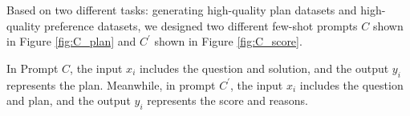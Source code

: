 \documentclass[11pt]{article}
\begin{document}

Based on two different tasks: generating high-quality plan datasets and high-quality preference datasets, we designed two different few-shot prompts $C$ shown in Figure \ref{fig:C_plan} and $C^{'}$ shown in Figure \ref{fig:C_score}. 


In Prompt $C$, the input $x_i$ includes the question and solution, and the output $y_i$ represents the plan. Meanwhile, in prompt $C^{'}$, the input $x_i$ includes the question and plan, and the output $y_i$ represents the score and reasons.
\end{document}
